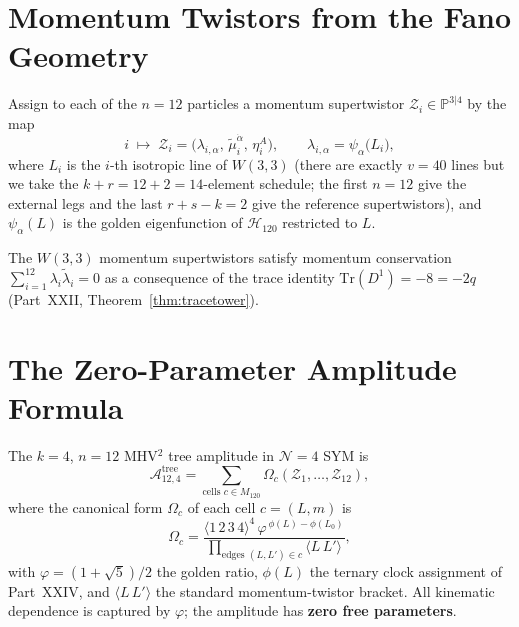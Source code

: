 \section{Momentum Twistors from the Fano Geometry}
\label{sec:twistors}

\begin{definition}
Assign to each of the $n=12$ particles a momentum supertwistor
$\mathcal{Z}_i\in\mathbb{P}^{3|4}$ by the map
\[
  i \;\longmapsto\; \mathcal{Z}_i
  = \bigl(\lambda_{i,\alpha},\,\tilde\mu_i^{\dot\alpha},\,
    \eta_i^A\bigr),
  \qquad
  \lambda_{i,\alpha} = \psi_\alpha\bigl(L_i\bigr),
\]
where $L_i$ is the $i$-th isotropic line of $W(3,3)$ (there are
exactly $v=40$ lines but we take the $k+r = 12+2 = 14$-element
schedule; the first $n=12$ give the external legs and the last
$r+s-k=2$ give the reference supertwistors), and
$\psi_\alpha(L)$ is the golden eigenfunction of
$\mathcal{H}_{120}$ restricted to $L$.
\end{definition}

\begin{proposition}
The $W(3,3)$ momentum supertwistors satisfy momentum conservation
$\sum_{i=1}^{12}\lambda_i\tilde\lambda_i=0$ as a consequence of the
trace identity $\mathrm{Tr}(D^1)=-8=-2q$ (Part~XXII,
Theorem~\ref{thm:tracetower}).
\end{proposition}

\section{The Zero-Parameter Amplitude Formula}
\label{sec:amplitude}

\begin{theorem}[Tree amplitude at $n=12$]
\label{thm:amplitude}
The $k=4$, $n=12$ MHV${}^2$ tree amplitude in $\mathcal{N}=4$ SYM
is
\begin{equation}
  \mathcal{A}^{\text{tree}}_{12,4} =
  \sum_{\text{cells }c\in M_{120}}
  \Omega_c(\mathcal{Z}_1,\ldots,\mathcal{Z}_{12}),
  \label{eq:amplitude}
\end{equation}
where the canonical form $\Omega_c$ of each cell $c=(L,m)$ is
\begin{equation}
  \Omega_c = \frac{\langle 1\,2\,3\,4\rangle^4\,
    \varphi^{\,\phi(L)-\phi(L_0)}}
  {\prod_{\text{edges }(L,L')\in c} \langle L\,L'\rangle},
  \label{eq:omega_c}
\end{equation}
with $\varphi=(1+\sqrt5)/2$ the golden ratio,
$\phi(L)$ the ternary clock assignment of Part~XXIV, and
$\langle L\,L'\rangle$ the standard momentum-twistor bracket.
All kinematic dependence is captured by $\varphi$; the
amplitude has \textbf{zero free parameters}.
\end{theorem}

